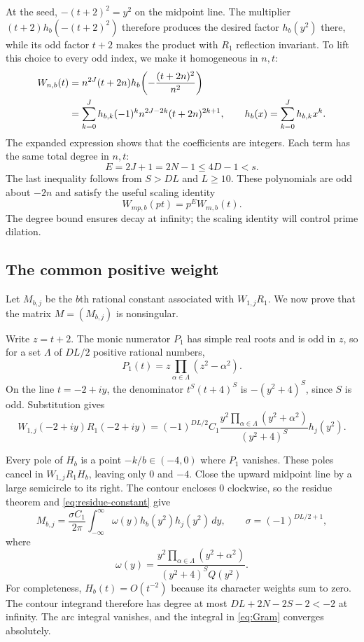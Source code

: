 At the seed, $-(t+2)^2=y^2$ on the midpoint line. The multiplier
$(t+2)h_b(-(t+2)^2)$ therefore produces the desired factor $h_b(y^2)$
there, while its odd factor $t+2$ makes the product with $R_1$
reflection invariant. To lift this choice to every odd index, we
make it homogeneous in $n,t$:
\begin{align}
 W_{n,b}(t)
 &=n^{2J}(t+2n)h_b\!\left(-\frac{(t+2n)^2}{n^2}\right)\notag\\
 &=\sum_{k=0}^J h_{b,k}(-1)^k n^{2J-2k}(t+2n)^{2k+1},
 \qquad h_b(x)=\sum_{k=0}^J h_{b,k}x^k.\label{eq:W}
\end{align}
The expanded expression shows that the coefficients are integers.
Each term has the same total degree in $n,t$:
\begin{equation}\label{eq:E}
 E=2J+1=2N-1\le4D-1<s.
\end{equation}
The last inequality follows from $S>DL$ and $L\ge10$.
These polynomials are odd about $-2n$ and satisfy the useful scaling
identity
\begin{equation}\label{eq:homogeneity}
 W_{mp,b}(pt)=p^E W_{m,b}(t).
\end{equation}
The degree bound ensures decay at infinity; the scaling identity
will control prime dilation.

\subsection{The common positive weight}

Let $M_{b,j}$ be the $b$th rational constant associated with
$W_{1,j}R_1$. We now prove that the matrix $M=(M_{b,j})$ is
nonsingular.

Write $z=t+2$. The monic numerator $P_1$ has simple real roots and
is odd in $z$, so for a set $\Lambda$ of $DL/2$ positive rational
numbers,
\[
 P_1(t)=z\prod_{\alpha\in\Lambda}(z^2-\alpha^2).
\]
On the line $t=-2+iy$, the denominator $t^S(t+4)^S$ is
$-(y^2+4)^S$, since $S$ is odd. Substitution gives
\begin{equation}\label{eq:midpoint-value}
 W_{1,j}(-2+iy)R_1(-2+iy)
 =(-1)^{DL/2}C_1
  \frac{y^2\prod_{\alpha\in\Lambda}(y^2+\alpha^2)}{(y^2+4)^S}
  h_j(y^2).
\end{equation}

Every pole of $H_b$ is a point $-k/b\in(-4,0)$ where $P_1$ vanishes.
These poles cancel in $W_{1,j}R_1H_b$, leaving only $0$ and $-4$.
Close the upward midpoint line by a large semicircle to its right.
The contour encloses $0$ clockwise, so the residue theorem and
\eqref{eq:residue-constant} give
\begin{equation}\label{eq:Gram}
 M_{b,j}=\frac{\sigma C_1}{2\pi}
    \int_{-\infty}^{\infty}\omega(y)h_b(y^2)h_j(y^2)\,dy,
 \qquad \sigma=(-1)^{DL/2+1},
\end{equation}
where
\[
 \omega(y)=\frac{y^2\prod_{\alpha\in\Lambda}(y^2+\alpha^2)}
                  {(y^2+4)^S Q(y^2)}.
\]
For completeness, $H_b(t)=O(t^{-2})$ because its character weights
sum to zero. The contour integrand therefore has degree at most
$DL+2N-2S-2<-2$ at infinity. The arc integral vanishes, and the
integral in \eqref{eq:Gram} converges absolutely.

